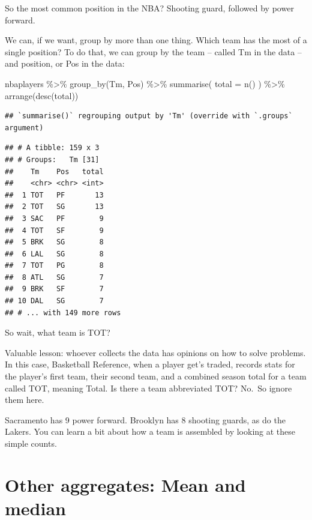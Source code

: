 \documentclass[
]{book}
\newenvironment{Shaded}{\begin{snugshade}}{\end{snugshade}}
\newcommand{\AttributeTok}[1]{\textcolor[rgb]{0.77,0.63,0.00}{#1}}
\newcommand{\FunctionTok}[1]{\textcolor[rgb]{0.00,0.00,0.00}{#1}}
\newcommand{\NormalTok}[1]{#1}
\newcommand{\SpecialCharTok}[1]{\textcolor[rgb]{0.00,0.00,0.00}{#1}}
\begin{document}
So the most common position in the NBA? Shooting guard, followed by power forward.

We can, if we want, group by more than one thing. Which team has the most of a single position? To do that, we can group by the team -- called Tm in the data -- and position, or Pos in the data:

\begin{Shaded}
\begin{Highlighting}[]
\NormalTok{nbaplayers }\SpecialCharTok{\%\textgreater{}\%}
  \FunctionTok{group\_by}\NormalTok{(Tm, Pos) }\SpecialCharTok{\%\textgreater{}\%}
  \FunctionTok{summarise}\NormalTok{(}
    \AttributeTok{total =} \FunctionTok{n}\NormalTok{()}
\NormalTok{  ) }\SpecialCharTok{\%\textgreater{}\%} \FunctionTok{arrange}\NormalTok{(}\FunctionTok{desc}\NormalTok{(total))}
\end{Highlighting}
\end{Shaded}

\begin{verbatim}
## `summarise()` regrouping output by 'Tm' (override with `.groups` argument)
\end{verbatim}

\begin{verbatim}
## # A tibble: 159 x 3
## # Groups:   Tm [31]
##    Tm    Pos   total
##    <chr> <chr> <int>
##  1 TOT   PF       13
##  2 TOT   SG       13
##  3 SAC   PF        9
##  4 TOT   SF        9
##  5 BRK   SG        8
##  6 LAL   SG        8
##  7 TOT   PG        8
##  8 ATL   SG        7
##  9 BRK   SF        7
## 10 DAL   SG        7
## # ... with 149 more rows
\end{verbatim}

So wait, what team is TOT?

Valuable lesson: whoever collects the data has opinions on how to solve problems. In this case, Basketball Reference, when a player get's traded, records stats for the player's first team, their second team, and a combined season total for a team called TOT, meaning Total. Is there a team abbreviated TOT? No.~So ignore them here.

Sacramento has 9 power forward. Brooklyn has 8 shooting guards, as do the Lakers. You can learn a bit about how a team is assembled by looking at these simple counts.

\hypertarget{other-aggregates-mean-and-median}{%
\section{Other aggregates: Mean and median}\label{other-aggregates-mean-and-median}}
\end{document}
